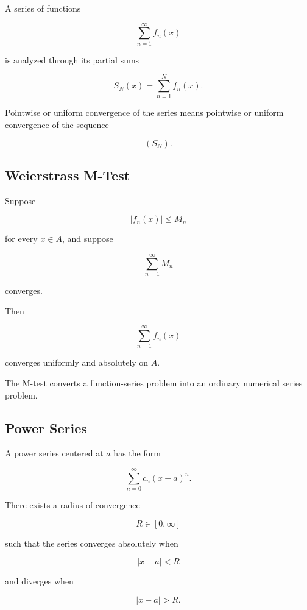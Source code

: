 A series of functions

\[
\sum_{n=1}^{\infty}f_n(x)
\]

is analyzed through its partial sums

\[
\boxed{
S_N(x)
=
\sum_{n=1}^{N}f_n(x).
}
\]

Pointwise or uniform convergence of the series means pointwise or uniform
convergence of the sequence

\[
(S_N).
\]

\subsection{Weierstrass M-Test}
\label{subsec:weierstrass-m-test}

\begin{theorem}
Suppose

\[
|f_n(x)|\leq M_n
\]

for every \(x\in A\), and suppose

\[
\sum_{n=1}^{\infty}M_n
\]

converges.

Then

\[
\boxed{
\sum_{n=1}^{\infty}f_n(x)
}
\]

converges uniformly and absolutely on \(A\).
\end{theorem}

The M-test converts a function-series problem into an ordinary numerical
series problem.

\subsection{Power Series}
\label{subsec:power-series-analysis}

A power series centered at \(a\) has the form

\[
\boxed{
\sum_{n=0}^{\infty}
c_n(x-a)^n.
}
\]

There exists a radius of convergence

\[
R\in[0,\infty]
\]

such that the series converges absolutely when

\[
|x-a|<R
\]

and diverges when

\[
|x-a|>R.
\]

